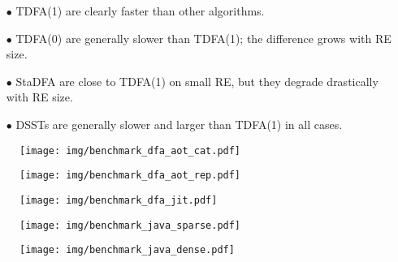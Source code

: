 \documentclass[]{article}
\begin{document}
\begin{itemize}

\item[$\bullet$]
TDFA(1) are clearly faster than other algorithms.
\medskip

\item[$\bullet$]
TDFA(0) are generally slower than TDFA(1); the difference grows with RE size.
\medskip

\item[$\bullet$]
StaDFA are close to TDFA(1) on small RE, but they degrade drastically with RE size.
\medskip

\item[$\bullet$]
DSSTs are generally slower and larger than TDFA(1) in all cases.

\end{itemize}

\pagebreak

\begin{figure}[t!]
\texttt{[image: img/benchmark\_dfa\_aot\_cat.pdf]}
\label{fig:benchmark_dfa_aot_cat}
\end{figure}

\begin{figure}[t!]
\texttt{[image: img/benchmark\_dfa\_aot\_rep.pdf]}
\label{fig:benchmark_dfa_aot_rep}
\end{figure}

\begin{figure}[t!]
\texttt{[image: img/benchmark\_dfa\_jit.pdf]}
\label{fig:benchmark_dfa_jit}
\end{figure}

\begin{figure}[t!]
\texttt{[image: img/benchmark\_java\_sparse.pdf]}
\label{fig:benchmark_java_sparse}
\end{figure}

\begin{figure}[b!]
\texttt{[image: img/benchmark\_java\_dense.pdf]}
\label{fig:benchmark_java_dense}
\end{figure}
\end{document}
